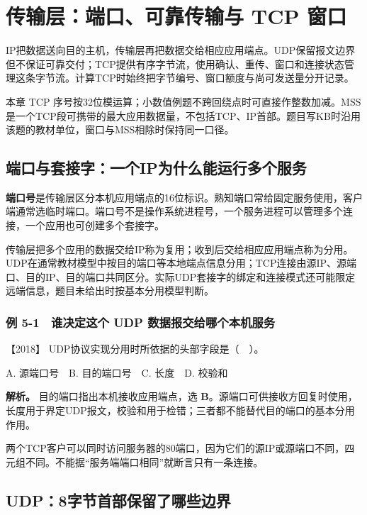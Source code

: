 \chapter{传输层：端口、可靠传输与 TCP 窗口}\label{cn-ch5}

IP把数据送向目的主机，传输层再把数据交给相应应用端点。UDP保留报文边界但不保证可靠交付；TCP提供有序字节流，使用确认、重传、窗口和连接状态管理这条字节流。计算TCP时始终把字节编号、窗口额度与尚可发送量分开记录。

本章 TCP 序号按32位模运算；小数值例题不跨回绕点时可直接作整数加减。MSS是一个TCP段可携带的最大应用数据量，不包括TCP、IP首部。题目写KB时沿用该题的教材单位，窗口与MSS相除时保持同一口径。

\section{端口与套接字：一个IP为什么能运行多个服务}\label{cn-05-01}

\textbf{端口号}是传输层区分本机应用端点的16位标识。熟知端口常给固定服务使用，客户端通常选临时端口。端口号不是操作系统进程号，一个服务进程可以管理多个连接，一个应用也可创建多个套接字。

传输层把多个应用的数据交给IP称为复用；收到后交给相应应用端点称为分用。UDP在通常教材模型中按目的端口等本地端点信息分用；TCP连接由源IP、源端口、目的IP、目的端口共同区分。实际UDP套接字的绑定和连接模式还可能限定远端信息，题目未给出时按基本分用模型判断。

\subsection{例 5-1　谁决定这个 UDP 数据报交给哪个本机服务}\label{cn-ex5-1}

\noindent{}【2018】 UDP协议实现分用时所依据的头部字段是（　）。

A. 源端口号　B. 目的端口号　C. 长度　D. 校验和


\textbf{解析。} 目的端口指出本机接收应用端点，选 \textbf{B}。源端口可供接收方回复时使用，长度用于界定UDP报文，校验和用于检错；三者都不能替代目的端口的基本分用作用。

两个TCP客户可以同时访问服务器的80端口，因为它们的源IP或源端口不同，四元组不同。不能据``服务端端口相同''就断言只有一条连接。

\section{UDP：8字节首部保留了哪些边界}\label{cn-05-02}

